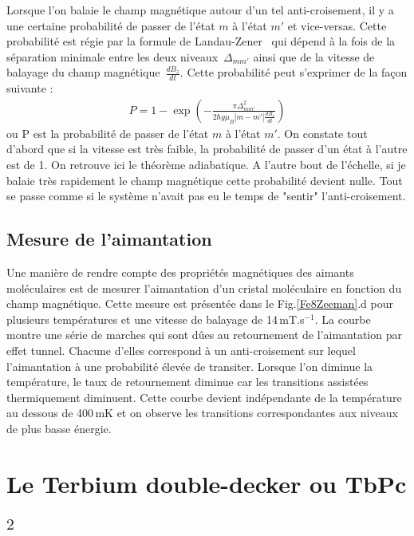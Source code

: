 Lorsque l'on balaie le champ magnétique autour d'un tel anti-croisement, il y a une certaine probabilité de passer de l'état $m$ à l'état $m'$ et vice-versas. Cette probabilité est régie par la formule de Landau-Zener~\cite{Zener1932} qui dépend à la fois de la séparation minimale entre les deux niveaux~$\Delta_{mm'}$ ainsi que de la vitesse de balayage du champ magnétique~$\frac{dB_z}{dt}$. Cette probabilité peut s'exprimer de la façon suivante :
\begin{eqnarray}
P = 1 - \exp \left( -\frac{\pi \Delta^2_{mm'}}{2 \hbar g \mu_B |m-m'|\frac{dB_z}{dt}} \right)
\end{eqnarray}
ou P est la probabilité de passer de l'état $m$ à l'état $m'$. On constate tout d'abord que si la vitesse est très faible, la probabilité de passer d'un état à l'autre est de 1. On retrouve ici le théorème adiabatique. A l'autre bout de l'échelle, si je balaie très rapidement le champ magnétique cette probabilité devient nulle. Tout se passe comme si le système n'avait pas eu le temps de "sentir" l'anti-croisement.

\subsection{Mesure de l'aimantation}
Une manière de rendre compte des propriétés magnétiques des aimants moléculaires est de mesurer l'aimantation d'un cristal moléculaire en fonction du champ magnétique. Cette mesure est présentée dans le Fig.\ref{Fe8Zeeman}.d pour plusieurs températures et une vitesse de balayage de 14\,mT.s$^{-1}$. La courbe montre une série de marches qui sont d\^ues au retournement de l'aimantation par effet tunnel. Chacune d'elles correspond à un anti-croisement sur lequel l'aimantation à une probabilité élevée de transiter. Lorsque l'on diminue la température, le taux de retournement diminue car les transitions assistées thermiquement diminuent. Cette courbe devient indépendante de la température au dessous de 400\,mK et on observe les transitions correspondantes aux niveaux de plus basse énergie. 


\section{Le Terbium double-decker ou TbPc$_2$}

